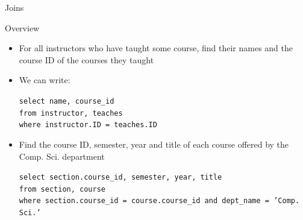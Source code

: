 \documentclass[aspectratio=169, xcolor=dvipsnames]{beamer}
\begin{document}
\begin{frame}{Joins}
    \begin{block}{Overview}
        \begin{itemize}[<+->]
            \item For all instructors who have taught some course, find their names and the course ID of the courses they taught
            \item We can write:
            \begin{center}
                \texttt{select name, course\_id \\
                        from instructor, teaches \\
                        where instructor.ID = teaches.ID}
            \end{center}
            \item Find the course ID, semester, year and title of each course offered by the Comp. Sci. department
            \label{cs_dept_query}
            \begin{center}
                \texttt{select section.course\_id, semester, year, title \\
                        from section, course \\
                        where section.course\_id = course.course\_id and dept\_name = 'Comp. Sci.'}
            \end{center}
        \end{itemize}
    \end{block}
\end{frame}
\end{document}
